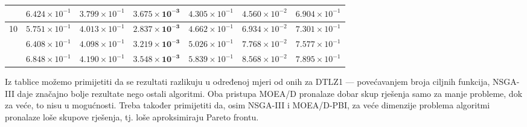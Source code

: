 \documentclass[times, utf8, zavrsni, numeric]{fer}
\begin{document}
\begin{table}[htb]
\begin{tabular}{c|c|c|c|c|c|c}
                    & $6.424\times 10^{-1}$    & $3.799\times 10^{-1}$ & $\mathbf{3.675\times 10^{-3}}$ & $4.305\times 10^{-1}$ & $4.560\times 10^{-2}$ & $6.904\times 10^{-1}$\\ \hline
\multirow{3}{*}{10} & $5.751\times 10^{-1}$    & $4.013\times 10^{-1}$ & $\mathbf{2.837\times 10^{-3}}$ & $4.662\times 10^{-1}$ & $6.934\times 10^{-2}$ & $7.301\times 10^{-1}$\\
			        & $6.408\times 10^{-1}$    & $4.098\times 10^{-1}$ & $\mathbf{3.219\times 10^{-3}}$ & $5.026\times 10^{-1}$ & $7.768\times 10^{-2}$ & $7.577\times 10^{-1}$\\
                    & $6.848\times 10^{-1}$    & $4.190\times 10^{-1}$ & $\mathbf{3.548\times 10^{-3}}$ & $5.839\times 10^{-1}$ & $8.568\times 10^{-2}$ & $7.895\times 10^{-1}$\\ \hline
\end{tabular}
\end{table}
Iz tablice možemo primijetiti da se rezultati razlikuju u određenoj mjeri od onih za DTLZ1 --- povećavanjem broja ciljnih funkcija, NSGA-III daje značajno bolje rezultate nego ostali algoritmi. Oba pristupa MOEA/D pronalaze dobar skup rješenja samo za manje probleme, dok za veće, to nisu u mogućnosti. Treba također primijetiti da, osim NSGA-III i MOEA/D-PBI, za veće dimenzije problema algoritmi pronalaze loše skupove rješenja, tj. loše aproksimiraju Pareto frontu.

\FloatBarrier
\end{document}
